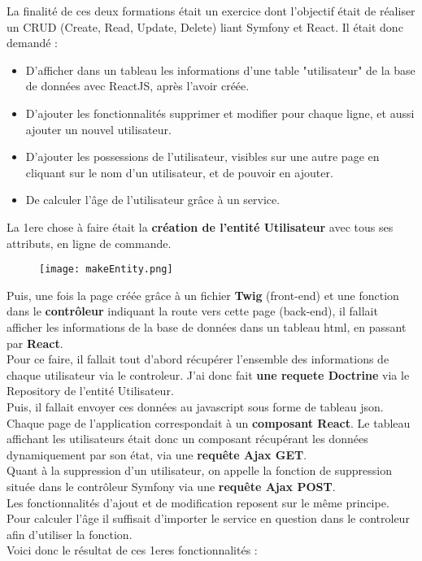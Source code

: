 La finalité de ces deux formations était un exercice dont l'objectif était de réaliser un CRUD (Create, Read, Update, Delete) liant Symfony et React.
Il était donc demandé :\\
\begin{itemize}
    \item D'afficher dans un tableau les informations d'une table "utilisateur" de la base de données avec ReactJS, après l'avoir créée.
    \item D'ajouter les fonctionnalités supprimer et modifier pour chaque ligne, et aussi ajouter un nouvel utilisateur.
    \item D'ajouter les possessions de l'utilisateur, visibles sur une autre page en cliquant sur le nom d'un utilisateur, et de pouvoir en ajouter.
    \item De calculer l'âge de l'utilisateur grâce à un service.
\end{itemize}

La 1ere chose à faire était la \textbf{création de l'entité Utilisateur} avec tous ses attributs, en ligne de commande.
\begin{figure}[H]
    \texttt{[image: makeEntity.png]}
\end{figure}


Puis, une fois la page créée grâce à un fichier \textbf{Twig} (front-end) et une fonction dans le \textbf{contrôleur} indiquant la route vers cette page (back-end), il fallait afficher les informations de la base de données dans un tableau html, en passant par \textbf{React}.\\
Pour ce faire, il fallait tout d'abord récupérer l'ensemble des informations de chaque utilisateur via le controleur. J'ai donc fait \textbf{une requete Doctrine} via le Repository de l'entité Utilisateur.
\\Puis, il fallait envoyer ces données au javascript sous forme de tableau json. Chaque page de l'application correspondait à un \textbf{composant React}. 
Le tableau affichant les utilisateurs était donc un composant récupérant les données dynamiquement par son état, via une \textbf{requête Ajax GET}.\\
Quant à la suppression d'un utilisateur, on appelle la fonction de suppression située dans le contrôleur Symfony via une \textbf{requête Ajax POST}.\\
Les fonctionnalités d'ajout et de modification reposent sur le même principe.\\
Pour calculer l'âge il suffisait d'importer le service en question dans le controleur afin d'utiliser la fonction.\\
Voici donc le résultat de ces 1eres fonctionnalités :

